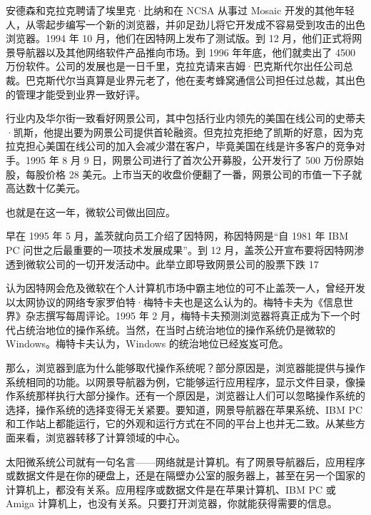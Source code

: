 \documentclass[12pt,UTF8]{ctexbook}
\begin{document}
安德森和克拉克聘请了埃里克·比纳和在 NCSA 从事过 Mosaic 开发的其他年轻人，从零起步编写一个新的浏览器，并卯足劲儿将它开发成不容易受到攻击的出色浏览器。1994 年 10 月，他们在因特网上发布了测试版。到 12 月，他们正式将网景导航器以及其他网络软件产品推向市场。到 1996 年年底，他们就卖出了 4500 万份软件。公司的发展也是一日千里，克拉克请来吉姆·巴克斯代尔出任公司总裁。巴克斯代尔当真算是业界元老了，他在麦考蜂窝通信公司担任过总裁，其出色的管理才能受到业界一致好评。

行业内及华尔街一致看好网景公司，其中包括行业内领先的美国在线公司的史蒂夫·凯斯，他提出要为网景公司提供首轮融资。但克拉克拒绝了凯斯的好意，因为克拉克担心美国在线公司的加入会减少潜在客户，毕竟美国在线是许多客户的竞争对手。1995 年 8 月 9 日，网景公司进行了首次公开募股，公开发行了 500 万份原始股，每股价格 28 美元。上市当天的收盘价便翻了一番，网景公司的市值一下子就高达数十亿美元。

也就是在这一年，微软公司做出回应。

早在 1995 年 5 月，盖茨就向员工介绍了因特网，称因特网是“自 1981 年 IBM PC 问世之后最重要的一项技术发展成果”。到 12 月，盖茨公开宣布要将因特网渗透到微软公司的一切开发活动中。此举立即导致网景公司的股票下跌 17%

认为因特网会危及微软在个人计算机市场中霸主地位的可不止盖茨一人，曾经开发以太网协议的网络专家罗伯特·梅特卡夫也是这么认为的。梅特卡夫为《信息世界》杂志撰写每周评论。1995 年 2 月，梅特卡夫预测浏览器将真正成为下一个时代占统治地位的操作系统。当然，在当时占统治地位的操作系统仍是微软的 Windows。梅特卡夫认为，Windows 的统治地位已经岌岌可危。

那么，浏览器到底为什么能够取代操作系统呢？部分原因是，浏览器能提供与操作系统相同的功能。以网景导航器为例，它能够运行应用程序，显示文件目录，像操作系统那样执行大部分操作。还有一个原因是，浏览器让人们可以忽略操作系统的选择，操作系统的选择变得无关紧要。要知道，网景导航器在苹果系统、IBM PC 和工作站上都能运行，它的外观和运行方式在不同的平台上也并无二致。从某些方面来看，浏览器转移了计算领域的中心。

太阳微系统公司就有一句名言——网络就是计算机。有了网景导航器后，应用程序或数据文件是在你的硬盘上，还是在隔壁办公室的服务器上，甚至在另一个国家的计算机上，都没有关系。应用程序或数据文件是在苹果计算机、IBM PC 或 Amiga 计算机上，也没有关系。只要打开浏览器，你就能获得需要的信息。
\end{document}

